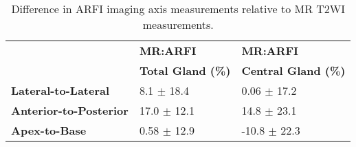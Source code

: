 \begin{table}[h!]
\centering
\caption{Difference in ARFI imaging axis measurements relative to MR T2WI measurements.}
\begin{tabular}{|l|l|l|} \hline
 & {\bf MR:ARFI} & {\bf MR:ARFI} \\
 & {\bf Total Gland (\%)} & {\bf Central Gland (\%)} \\ \hline
{\bf Lateral-to-Lateral} & 8.1 $\pm$ 18.4 & 0.06 $\pm$ 17.2 \\
{\bf Anterior-to-Posterior} & 17.0 $\pm$ 12.1 & 14.8 $\pm$ 23.1 \\
{\bf Apex-to-Base} & 0.58 $\pm$ 12.9 & -10.8 $\pm$ 22.3 \\
\hline
\end{tabular}
\label{tab:mr_arfi_axes_error}
\end{table}
